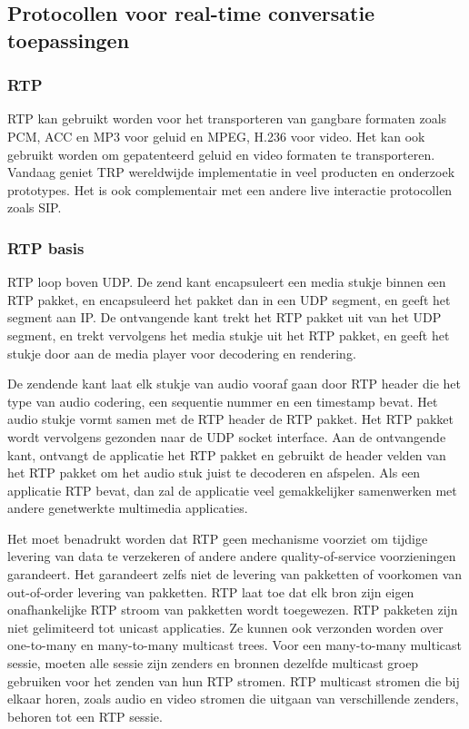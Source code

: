 \subsection{Protocollen voor real-time conversatie toepassingen}

\subsubsection{RTP}

\noindent RTP kan gebruikt worden voor het transporteren van gangbare formaten zoals PCM, ACC en MP3 voor geluid en MPEG, H.236 voor video. Het kan ook gebruikt worden om gepatenteerd geluid en video formaten te transporteren. Vandaag geniet TRP wereldwijde implementatie in veel producten en onderzoek prototypes. Het is ook complementair met een andere live interactie protocollen zoals SIP.

\subsubsection{RTP basis}

\noindent RTP loop boven UDP. De zend kant encapsuleert een media stukje binnen een RTP pakket, en encapsuleerd het pakket dan in een UDP segment, en geeft het segment aan IP. De ontvangende kant trekt het RTP pakket uit van het UDP segment, en trekt vervolgens het media stukje uit het RTP pakket, en geeft het stukje door aan de media player voor decodering en rendering.

\noindent De zendende kant laat elk stukje van audio vooraf gaan door RTP header die het type van audio codering, een sequentie nummer en een timestamp bevat. Het audio stukje vormt samen met de RTP header de RTP pakket. Het RTP pakket wordt vervolgens gezonden naar de UDP socket interface. Aan de ontvangende kant, ontvangt de applicatie het RTP pakket en gebruikt de header velden van het RTP pakket om het audio stuk juist te decoderen en afspelen.
Als een applicatie RTP bevat, dan zal de applicatie veel gemakkelijker samenwerken met andere genetwerkte multimedia applicaties.

\noindent Het moet benadrukt worden dat RTP geen mechanisme voorziet om tijdige levering van data te verzekeren of andere andere quality-of-service voorzieningen garandeert. Het garandeert zelfs niet de levering van pakketten of voorkomen van out-of-order levering van pakketten.
RTP laat toe dat elk bron zijn eigen onafhankelijke RTP stroom van pakketten wordt toegewezen. RTP pakketen zijn niet gelimiteerd tot unicast applicaties. Ze kunnen ook verzonden worden over one-to-many en many-to-many multicast trees. Voor een many-to-many multicast sessie, moeten alle sessie zijn zenders en bronnen dezelfde multicast groep gebruiken voor het zenden van hun RTP stromen. RTP multicast stromen die bij elkaar horen, zoals audio en video stromen die uitgaan van verschillende zenders, behoren tot een RTP sessie.



